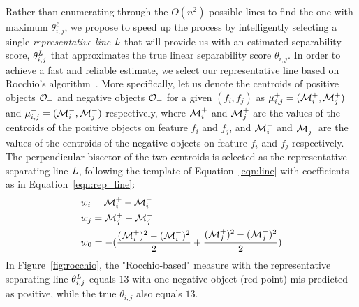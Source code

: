  Rather than enumerating through the $O(n^2)$ possible lines to find the one with maximum $\theta_{i,j}^{\ell}$, we propose to speed up the process by intelligently selecting a single {\em representative line} $\mathit{L}$ that will provide us with an estimated separability score, $\theta_{i,j}^{\mathit{L}}$ that approximates the true linear separability score $\theta_{i, j}$.
In order to achieve a fast and reliable estimate, we select our representative line based on Rocchio's algorithm~\cite{rocchio1971relevance}.
More specifically, let us denote the centroids of positive objects ${\mathcal{O}}_+$ and negative objects ${\mathcal{O}}_-$ for a given $(f_i,f_j)$ as $\mu_{i,j}^+=({\mathcal{M}}_i^+,{\mathcal{M}}_j^+)$ and $\mu_{i,j}^-=({\mathcal{M}}_i^-,{\mathcal{M}}_j^-)$ respectively, where ${\mathcal{M}}_i^+$ and ${\mathcal{M}}_j^+$ are the values of the centroids of the positive objects on feature $f_i$ and $f_j$, and ${\mathcal{M}}_i^-$ and ${\mathcal{M}}_j^-$ are the values of the centroids of the negative objects on feature $f_i$ and $f_j$ respectively. The perpendicular bisector of the two centroids is selected as the representative separating line $\mathit{L}$, following the template of Equation~\ref{eqn:line} with coefficients as in Equation~\ref{eqn:rep_line}:
\begin{equation}\label{eqn:rep_line}
\begin{split}
& w_i = {\mathcal{M}}_i^+-{\mathcal{M}}_i^- \\
& w_j = {\mathcal{M}}_j^+-{\mathcal{M}}_j^- \\
& w_0 = -(\frac{({\mathcal{M}}_i^+)^2-({\mathcal{M}}_i^-)^2}{2}+\frac{({\mathcal{M}}_j^+)^2-({\mathcal{M}}_j^-)^2}{2})
\end{split}
\end{equation}
\noindent In Figure~\ref{fig:rocchio}, the "Rocchio-based" measure with the representative separating line $\theta_{i,j}^{\mathit{L}}$ equals $13$ with one negative object (red point) mis-predicted as positive, while the true $\theta_{i,j}$ also equals $13$.

